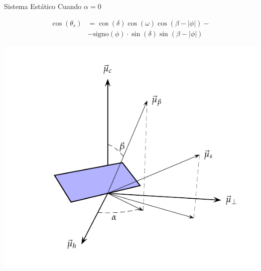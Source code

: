 \documentclass[xcolor={usenames,svgnames,dvipsnames}]{beamer}
\begin{document}
\begin{frame}[label={sec:org254b0b1}]{Sistema Estático}
Cuando \(\alpha=0\)

\begin{align*}
\cos(\theta_{s}) &= \cos\left(\delta\right)\cos\left(\omega\right)\cos\left(\beta-|\phi|\right)-\\ 
&- \mathrm{signo}(\phi)\cdot\sin(\delta)\sin\left(\beta-|\phi|\right)
\end{align*}


\begin{center}
\includegraphics[height=0.6\textheight]{../figs/AngulosSistemaEstatico.pdf}
\end{center}
\end{frame}
\end{document}
